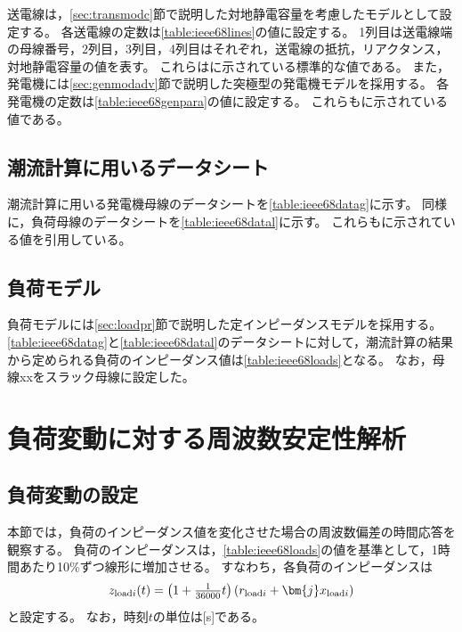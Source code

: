 \documentclass[tombow,dvipdfmx]{corona-a5-1.1}
\begin{document}
送電線は，\ref{sec:transmodc}節で説明した対地静電容量を考慮したモデルとして設定する。
各送電線の定数は\ref{table:ieee68lines}の値に設定する。
1列目は送電線端の母線番号，2列目，3列目，4列目はそれぞれ，送電線の抵抗，リアクタンス，対地静電容量の値を表す。
これらは\cite[Appendix A]{pal2006robust}に示されている標準的な値である。
また，発電機には\ref{sec:genmodadv}節で説明した突極型の発電機モデルを採用する。
各発電機の定数は\ref{table:ieee68genpara}の値に設定する。
これらも\cite[Appendix B]{pal2006robust}に示されている値である。



\subsection{潮流計算に用いるデータシート}


潮流計算に用いる発電機母線のデータシートを\ref{table:ieee68datag}に示す。
同様に，負荷母線のデータシートを\ref{table:ieee68datal}に示す。
これらも\cite[Appendix A]{pal2006robust}に示されている値を引用している。


\subsection{負荷モデル}

負荷モデルには\ref{sec:loadpr}節で説明した定インピーダンスモデルを採用する。
\ref{table:ieee68datag}と\ref{table:ieee68datal}のデータシートに対して，潮流計算の結果から定められる負荷のインピーダンス値は\ref{table:ieee68loads}となる。
なお，母線xxをスラック母線に設定した。





\section{負荷変動に対する周波数安定性解析}

\subsection{負荷変動の設定}

本節では，負荷のインピーダンス値を変化させた場合の周波数偏差の時間応答を観察する。
負荷のインピーダンスは，\ref{table:ieee68loads}の値を基準として，1時間あたり10\%ずつ線形に増加させる。
すなわち，各負荷のインピーダンスは
\begin{align}\label{eq:loadvary68}
z_{{\rm load}i}(t) = \left(1+\tfrac{1}{36000}t \right) \left( r_{{\rm load}i} + \bm{j} x_{{\rm load}i} \right)
\end{align}
と設定する。
なお，時刻$t$の単位は[s]である。
\end{document}
